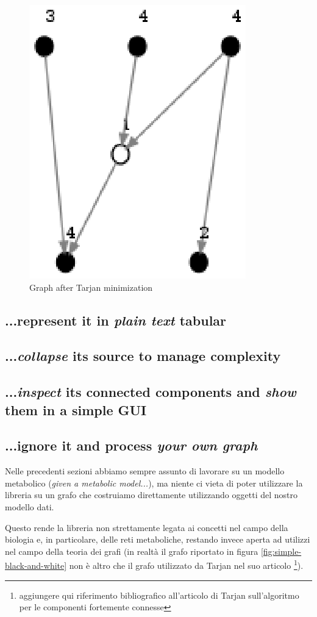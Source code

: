 \begin{figure}
  \centering
  \includegraphics{images/OnePipingLevelUnitTest_Printer_DFS_PrinterPipe_Crescenzi-phase-PrinterPipeFilter-level-2.eps}
  \caption{Graph after Tarjan minimization}
  \label{fig:tarjan-output}
\end{figure}

\subsection{...represent it in \emph{plain text} tabular}

\subsection{...\emph{collapse} its source to manage complexity}

\subsection{...\emph{inspect} its connected components and \emph{show}
  them in a simple GUI}

\subsection{...ignore it and process \emph{your own graph}}
Nelle precedenti sezioni abbiamo sempre assunto di lavorare su un
modello metabolico (\emph{given a metabolic model...}), ma niente ci
vieta di poter utilizzare la libreria su un grafo che costruiamo
direttamente utilizzando oggetti del nostro modello dati.

Questo rende la libreria non strettamente legata ai concetti nel campo
della biologia e, in particolare, delle reti metaboliche, restando
invece aperta ad utilizzi nel campo della teoria dei grafi (in
realt\`a il grafo riportato in figura \ref{fig:simple-black-and-white}
non \`e altro che il grafo utilizzato da Tarjan nel suo articolo
\footnote{aggiungere qui riferimento bibliografico all'articolo di
  Tarjan sull'algoritmo per le componenti fortemente connesse}).


